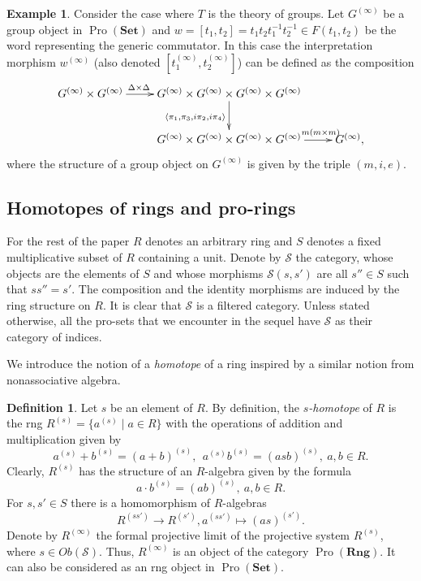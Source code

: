 \documentclass[oneside, 11pt]{amsart}
\numberwithin{equation}{section}
\theoremstyle{definition}
\newtheorem{df}[lemma]{Definition} \Crefname{df}{Definition}{Definitions}
\newtheorem{example}[lemma]{Example} \Crefname{example}{Example}{Examples}
\theoremstyle{remark}
\DeclareMathOperator{\Pro}{Pro}
\newcommand{\Set}{\mathbf{Set}}
\newcommand{\Rng}{\mathbf{Rng}}
\begin{document}
\begin{example}\label{example-commutator}
Consider the case where $T$ is the theory of groups.
Let $G^{(\infty)}$ be a group object in $\Pro(\Set)$ and $w = [t_1, t_2] = t_1 t_2 t_1^{-1} t_2^{-1} \in F(t_1, t_2)$ be the word representing the generic commutator.
In this case the interpretation morphism $w^{(\infty)}$ (also denoted $[t_1^{(\infty)}, t_2^{(\infty)}]$) can be defined as the composition
 \[ \xymatrix{G^{(\infty)} \times G^{(\infty)} \ar[r]^(.35){\Delta \times \Delta} & G^{(\infty)} \times G^{(\infty)} \times G^{(\infty)} \times G^{(\infty)} \ar[d]_{\langle \pi_1, \pi_3, i\pi_2, i\pi_4 \rangle} & \\
    & G^{(\infty)} \times G^{(\infty)} \times G^{(\infty)} \times G^{(\infty)} \ar[r]^(.76){m(m\times m)} & G^{(\infty)},} \]
where the structure of a group object on $G^{(\infty)}$ is given by the triple $(m, i, e)$.
\end{example}

\subsection{Homotopes of rings and pro-rings} \label{sec:rng-homotopes}
For the rest of the paper $R$ denotes an arbitrary ring and \(S\) denotes a fixed multiplicative subset of $R$ containing a unit. Denote by $\mathcal{S}$ the category, whose objects are the elements of \(S\) and whose morphisms \(\mathcal{S}(s, s')\) are all \(s'' \in S\) such that \(ss'' = s'\). The composition and the identity morphisms are induced by the ring structure on $R$. It is clear that $\mathcal{S}$ is a filtered category. Unless stated otherwise, all the pro-sets that we encounter in the sequel have \(\mathcal S\) as their category of indices.

We introduce the notion of a {\it homotope} of a ring inspired by a similar notion from nonassociative algebra.
\begin{df} \label{ring-homotope}
 Let $s$ be an element of $R$.  
 By definition, the {\it \(s\)-homotope} of \(R\) is the rng \(R^{(s)} = \{a^{(s)} \mid a \in R\}\) with the operations of addition and multiplication given by
 \[ a^{(s)} + b^{(s)} = (a + b)^{(s)},\ \ a^{(s)} b^{(s)} = (asb)^{(s)},\ a, b\in R.\]
 Clearly, $R^{(s)}$ has the structure of an \(R\)-algebra given by the formula \[a \cdot b^{(s)} = (ab)^{(s)},\ a, b \in R.\] For \(s, s' \in S\) there is a homomorphism of \(R\)-algebras \[R^{(ss')} \to R^{(s')}, a^{(ss')} \mapsto (as)^{(s')}.\]
 Denote by \(R^{(\infty)}\) the formal projective limit of the projective system \(R^{(s)}\), where \(s \in Ob(\mathcal S)\).
 Thus, $R^{(\infty)}$ is an object of the category $\Pro(\Rng)$. 
 It can also be considered as an rng object in \(\Pro(\Set)\).  
\end{df}
\end{document}
